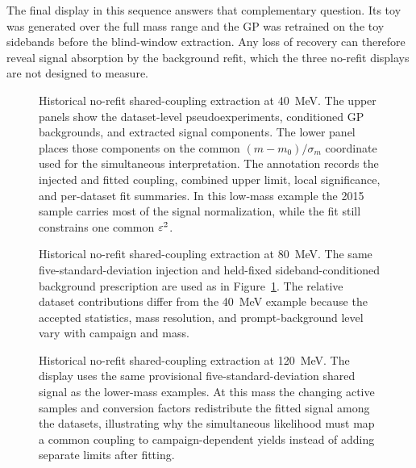 The final display in this sequence answers that complementary question. Its toy was
generated over the full mass range and the GP was retrained on the toy sidebands before
the blind-window extraction. Any loss of recovery can therefore reveal signal
absorption by the background refit, which the three no-refit displays are not designed
to measure.

\clearpage
\begin{landscape}
\begin{figure}[H]
\centering
{}
\caption{Historical no-refit shared-coupling extraction at \SI{40}{MeV}. The upper
panels show the dataset-level pseudoexperiments, conditioned GP backgrounds, and
extracted signal components. The lower panel places those components on the common
$(m-m_0)/\sigma_m$ coordinate used for the simultaneous interpretation. The annotation
records the injected and fitted coupling, combined upper limit, local significance,
and per-dataset fit summaries. In this low-mass example the 2015 sample carries most
of the signal normalization, while the fit still constrains one common $\varepsilon^2$.}
\label{fig:app-combined-extract-no-refit}
\end{figure}
\end{landscape}

\begin{landscape}
\begin{figure}[H]
\centering
{}
\caption{Historical no-refit shared-coupling extraction at \SI{80}{MeV}. The same
five-standard-deviation injection and held-fixed sideband-conditioned background
prescription are used as in Figure~\ref{fig:app-combined-extract-no-refit}. The
relative dataset contributions differ from the \SI{40}{MeV} example because the
accepted statistics, mass resolution, and prompt-background level vary with campaign
and mass.}
\label{fig:app-combined-extract-no-refit-80}
\end{figure}
\end{landscape}

\begin{landscape}
\begin{figure}[H]
\centering
{}
\caption{Historical no-refit shared-coupling extraction at \SI{120}{MeV}. The display
uses the same provisional five-standard-deviation shared signal as the lower-mass
examples. At this mass the changing active samples and conversion factors redistribute
the fitted signal among the datasets, illustrating why the simultaneous likelihood
must map a common coupling to campaign-dependent yields instead of adding separate
limits after fitting.}
\label{fig:app-combined-extract-no-refit-120}
\end{figure}
\end{landscape}

